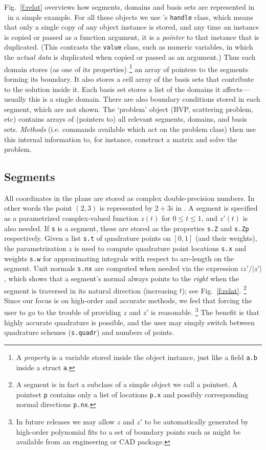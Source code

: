 \documentclass[12pt]{article}
\begin{document}
Fig.~\ref{f:relat} overviews how segments, domains and basis sets are
represented in \mpspack\ in a simple example.
For all these objects we use \matlab's {\tt handle} class,
which means that only a single copy of any object instance is
stored, and any time an instance is copied or passed as a function argument,
it is a {\em pointer} to that instance that is duplicated.
(This contrasts the {\tt value} class, such as numeric variables,
in which the {\em actual data} is duplicated when copied or passed as an
argument.)
Thus each domain stores (as one of its properties)%
  \footnote{A {\em property} is a variable stored inside the
    object instance, just like a field {\tt a.b} inside a struct {\tt a}.}
an array of pointers to the
segments forming its boundary.
It also stores a cell array of the basis sets that
contribute to the solution inside it.
Each basis set stores a list of the domains it affects---usually
this is a single domain.
There are also boundary conditions stored in
each segment, which are not shown.
The `problem' object (BVP, scattering problem, etc) contains arrays of
(pointers to) all relevant segments, domains, and basis sets.
{\em Methods} (i.e. commands available which act on the problem class)
then use this internal information to, for instance,
construct a matrix and solve the problem.

\subsection{Segments} %

All coordinates in the plane are stored as complex double-precision
numbers. In other words the point 
$(2,3)$ is represented by $2+3i$ in \mpspack.
A segment is specified as a parametrized complex-valued
function $z(t)$ for $0\le t\le 1$, and $z'(t)$ is also needed.
If {\tt s} is a segment, these are stored as the properties
{\tt s.Z} and {\tt s.Zp} respectively.
Given a list {\tt s.t} of quadrature points on $[0,1]$
(and their weights),
the parametrization $z$ is used to compute quadrature point locations
{\tt s.x} and weights {\tt s.w}
for approximating integrals with respect to arc-length on the segment.
Unit normals {\tt s.nx} are computed when needed via the expression $iz'/|z'|$,
which shows that a segment's normal always points to the {\em right}
when the segment is traversed in its natural direction (increasing $t$);
see Fig.~\ref{f:relat}.%
  \footnote{A segment is in fact a
    subclass of a simple object we call a pointset.
    A pointset {\tt p} contains only a list of locations {\tt p.x}
    and possibly corresponding normal directions {\tt p.nx}.}
Since our focus is on high-order and accurate methods,
we feel that forcing the user to go to the trouble of providing $z$ and $z'$
is reasonable.%
  \footnote{In future releases we may allow $z$ and $z'$ to be automatically
    generated by high-order polynomial fits to a set of boundary points such
    as might be available from an engineering or CAD package.}
The benefit is that highly accurate quadrature is possible, and
the user may simply switch between quadrature schemes ({\tt s.quadr})
and numbers of points.
\end{document}
